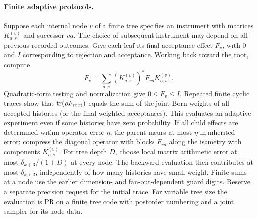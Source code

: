 \paragraph{Finite adaptive protocols.}
Suppose each internal node $v$ of a finite tree specifies an instrument with matrices $K_{a,s}^{(v)}$ and successor $va$. The choice of subsequent instrument may depend on all previous recorded outcomes. Give each leaf its final acceptance effect $F_v$, with $0$ and $I$ corresponding to rejection and acceptance. Working back toward the root, compute
\[
 F_v=\sum_{a,s}(K_{a,s}^{(v)})^* F_{va} K_{a,s}^{(v)}.
\]
Quadratic-form testing and normalization give $0\le F_v\le I$. Repeated finite cyclic traces show that $\operatorname{tr}(\rho F_{\rm root})$ equals the sum of the joint Born weights of all accepted histories (or the final weighted acceptances). This evaluates an adaptive experiment even if some histories have zero probability. If all child effects are determined within operator error $\eta$, the parent incurs at most $\eta$ in inherited error: compress the diagonal operator with blocks $F_{va}$ along the isometry with components $K_{a,s}^{(v)}$. For tree depth $D$, choose local matrix arithmetic error at most $\delta_{k+3}/(1+D)$ at every node. The backward evaluation then contributes at most $\delta_{k+3}$, independently of how many histories have small weight. Finite sums at a node use the earlier dimension- and fan-out-dependent guard digits. Reserve a separate precision request for the initial trace. For variable tree size the evaluation is PR on a finite tree code with postorder numbering and a joint sampler for its node data.
